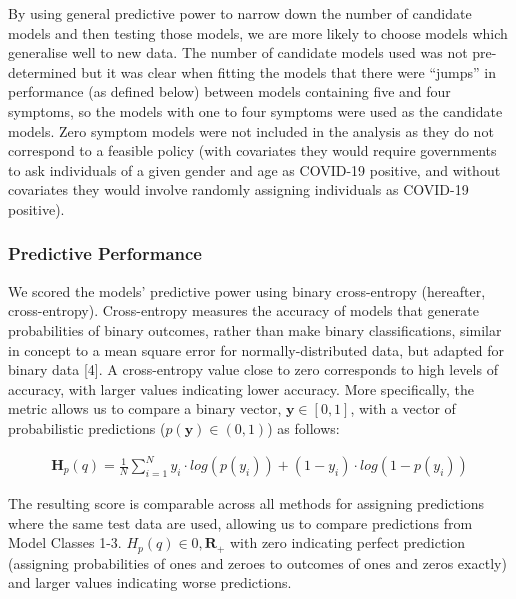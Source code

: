 \documentclass[]{elsarticle} %
\begin{document}
By using general predictive power to narrow down the number of candidate models and then testing those models, we are more likely to choose models which generalise well to new data.
The number of candidate models used was not pre-determined but it was clear when fitting the models that there were ``jumps'' in performance (as defined below) between models containing five and four symptoms, so the models with one to four symptoms were used as the candidate models.
Zero symptom models were not included in the analysis as they do not correspond to a feasible policy (with covariates they would require governments to ask individuals of a given gender and age as COVID-19 positive, and without covariates they would involve randomly assigning individuals as COVID-19 positive).

\hypertarget{predictive-performance}{%
\subsubsection{Predictive Performance}\label{predictive-performance}}

We scored the models' predictive power using binary cross-entropy (hereafter, cross-entropy).
Cross-entropy measures the accuracy of models that generate probabilities of binary outcomes, rather than make binary classifications, similar in concept to a mean square error for normally-distributed data, but adapted for binary data {[}4{]}.
A cross-entropy value close to zero corresponds to high levels of accuracy, with larger values indicating lower accuracy.
More specifically, the metric allows us to compare a binary vector, \(\boldsymbol{y}\in [0,1]\), with a vector of probabilistic predictions (\(p(\boldsymbol{y})\in (0,1)\)) as follows:

\begin{equation}\begin{aligned}
\boldsymbol{H}_p(q)=\frac{1}{N}\sum_{i=1}^{N}y_i\cdot log(p(y_i))+(1-y_i)\cdot log(1-p(y_i))
\label{eq:CrossEntropy}
\end{aligned}\end{equation}\ignorespacesafterend

The resulting score is comparable across all methods for assigning predictions where the same test data are used, allowing us to compare predictions from Model Classes 1-3.
\(H_p(q)\in {0,\boldsymbol{R}_+}\) with zero indicating perfect prediction (assigning probabilities of ones and zeroes to outcomes of ones and zeros exactly) and larger values indicating worse predictions.
\end{document}
